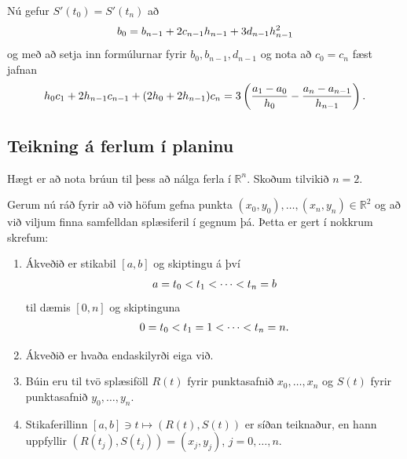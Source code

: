 \documentclass[letterpaper,10pt,icelandic]{sphinxmanual}
\begin{document}
Nú gefur \(S'(t_0) = S'(t_n)\) að
\begin{gather}
\begin{split}b_0 = b_{n-1} + 2c_{n-1}h_{n-1} + 3d_{n-1}h_{n-1}^2\end{split}\notag
\end{gather}
og með að setja inn formúlurnar fyrir \(b_0, b_{n-1}, d_{n-1}\) og
nota að \(c_0 = c_n\) fæst jafnan
\begin{gather}
\begin{split}h_0c_1 + 2h_{n-1}c_{n-1} + (2h_0 + 2h_{n-1})c_n
    = 3 \left( \frac{a_1-a_0}{h_0}
        - \frac{a_n-a_{n-1}}{h_{n-1}} \right).\end{split}\notag
\end{gather}

\subsection{Teikning á ferlum í planinu}
\label{kafli03:teikning-a-ferlum-i-planinu}\label{kafli03:index-22}
Hægt er að nota brúun til þess að nálga ferla í \(\mathbb R^n\).
Skoðum tilvikið \(n=2\).

Gerum nú ráð fyrir að við höfum gefna punkta \((x_0,y_0),\dots,(x_n,y_n) \in \mathbb R^2\)
og að við viljum finna samfelldan splæsiferil í gegnum þá. Þetta er gert
í nokkrum skrefum:
\begin{enumerate}
\item {} 
Ákveðið er stikabil \([a,b]\) og skiptingu á því
\begin{gather}
\begin{split}a=t_0<t_1<\cdots<t_n=b\end{split}\notag
\end{gather}
til dæmis \([0,n]\) og skiptinguna
\begin{gather}
\begin{split}0=t_0<t_1=1<\cdots<t_n=n.\end{split}\notag
\end{gather}
\item {} 
Ákveðið er hvaða endaskilyrði eiga við.

\item {} 
Búin eru til tvö splæsiföll \(R(t)\) fyrir punktasafnið
\(x_0,\dots,x_n\) og \(S(t)\) fyrir punktasafnið
\(y_0,\dots,y_n\).

\item {} 
Stikaferillinn \([a,b]\ni t\mapsto (R(t),S(t))\) er síðan teiknaður, en hann uppfyllir
\((R(t_j),S(t_j))=(x_j,y_j)\), \(j=0,\dots,n\).

\end{enumerate}
\end{document}
